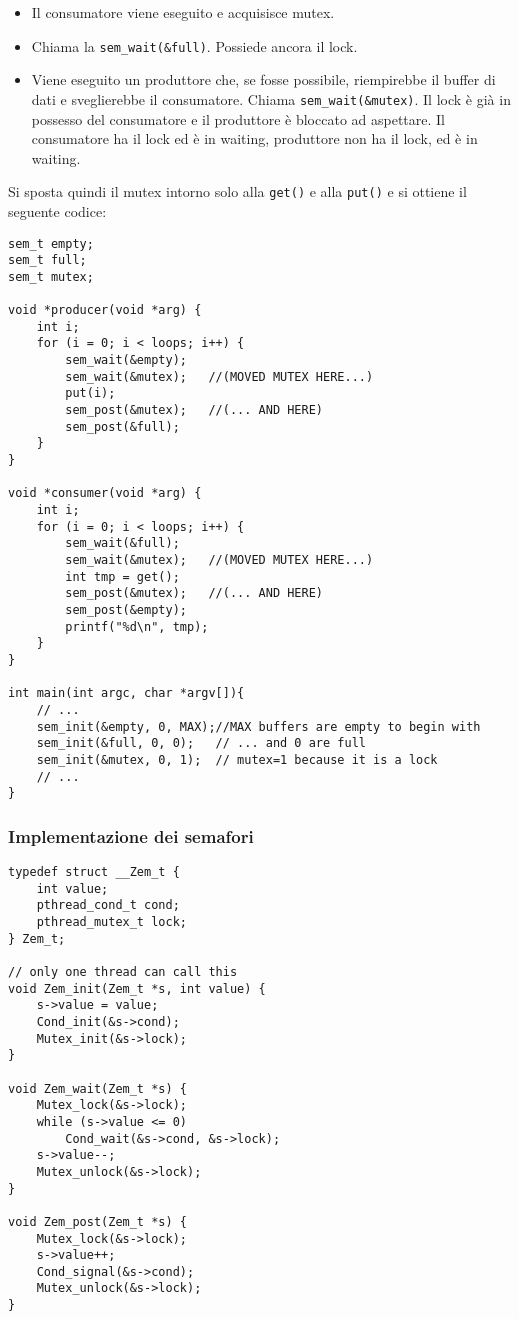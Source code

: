 \documentclass[12pt, letterpaper]{article}
\begin{document}
				\begin{itemize}
					\item Il consumatore viene eseguito e acquisisce mutex. 
					\item Chiama la \texttt{sem\_wait(\&full)}. Possiede ancora il lock.
					\item Viene eseguito un produttore che, se fosse possibile, riempirebbe il buffer di dati e sveglierebbe il consumatore. Chiama \texttt{sem\_wait(\&mutex)}. Il lock è già in possesso del consumatore e il produttore è bloccato ad aspettare. Il consumatore ha il lock ed è in waiting, produttore non ha il lock, ed è in waiting.
				\end{itemize}
				Si sposta quindi il mutex intorno solo alla \texttt{get()} e alla \texttt{put()} e si ottiene il seguente codice: 
				\begin{lstlisting}[style=CStyle]
sem_t empty;
sem_t full;
sem_t mutex;

void *producer(void *arg) {
	int i;
	for (i = 0; i < loops; i++) {
		sem_wait(&empty);
		sem_wait(&mutex);	//(MOVED MUTEX HERE...)
		put(i);
		sem_post(&mutex);	//(... AND HERE)
		sem_post(&full);
	}
}

void *consumer(void *arg) {
	int i;
	for (i = 0; i < loops; i++) {
		sem_wait(&full);
		sem_wait(&mutex);	//(MOVED MUTEX HERE...)
		int tmp = get();
		sem_post(&mutex);	//(... AND HERE)
		sem_post(&empty);
		printf("%d\n", tmp);
	}
}

int main(int argc, char *argv[]){
	// ...
	sem_init(&empty, 0, MAX);//MAX buffers are empty to begin with
	sem_init(&full, 0, 0);   // ... and 0 are full
	sem_init(&mutex, 0, 1);  // mutex=1 because it is a lock
	// ...
}				\end{lstlisting}
			\subsubsection{Implementazione dei semafori}
				\begin{lstlisting}[style=CStyle]
typedef struct __Zem_t {
	int value;
	pthread_cond_t cond;
	pthread_mutex_t lock;
} Zem_t;

// only one thread can call this
void Zem_init(Zem_t *s, int value) {
	s->value = value;
	Cond_init(&s->cond);
	Mutex_init(&s->lock);
}

void Zem_wait(Zem_t *s) {
	Mutex_lock(&s->lock);
	while (s->value <= 0)
		Cond_wait(&s->cond, &s->lock);
	s->value--;
	Mutex_unlock(&s->lock);
}

void Zem_post(Zem_t *s) {
	Mutex_lock(&s->lock);
	s->value++;
	Cond_signal(&s->cond);
	Mutex_unlock(&s->lock);
}				\end{lstlisting}
\end{document}
